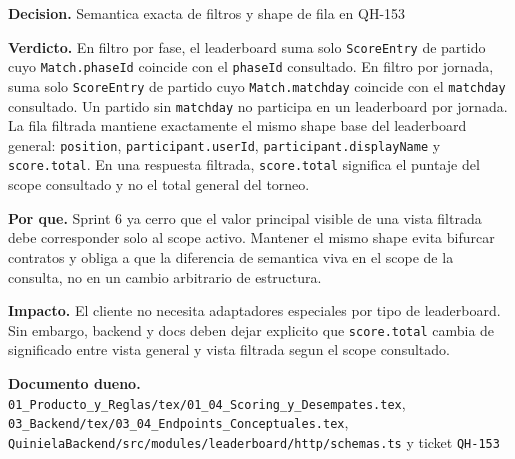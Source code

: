\begin{docnote}
\textbf{Decision.} Semantica exacta de filtros y shape de fila en QH-153

\textbf{Verdicto.} En filtro por fase, el leaderboard suma solo \texttt{ScoreEntry} de partido cuyo \texttt{Match.phaseId} coincide con el \texttt{phaseId} consultado. En filtro por jornada, suma solo \texttt{ScoreEntry} de partido cuyo \texttt{Match.matchday} coincide con el \texttt{matchday} consultado. Un partido sin \texttt{matchday} no participa en un leaderboard por jornada. La fila filtrada mantiene exactamente el mismo shape base del leaderboard general: \texttt{position}, \texttt{participant.userId}, \texttt{participant.displayName} y \texttt{score.total}. En una respuesta filtrada, \texttt{score.total} significa el puntaje del scope consultado y no el total general del torneo.

\textbf{Por que.} Sprint 6 ya cerro que el valor principal visible de una vista filtrada debe corresponder solo al scope activo. Mantener el mismo shape evita bifurcar contratos y obliga a que la diferencia de semantica viva en el scope de la consulta, no en un cambio arbitrario de estructura.

\textbf{Impacto.} El cliente no necesita adaptadores especiales por tipo de leaderboard. Sin embargo, backend y docs deben dejar explicito que \texttt{score.total} cambia de significado entre vista general y vista filtrada segun el scope consultado.

\textbf{Documento dueno.} \texttt{01\_Producto\_y\_Reglas/tex/01\_04\_Scoring\_y\_Desempates.tex}, \texttt{03\_Backend/tex/03\_04\_Endpoints\_Conceptuales.tex}, \texttt{QuinielaBackend/src/modules/leaderboard/http/schemas.ts} y ticket \texttt{QH-153}
\end{docnote}

